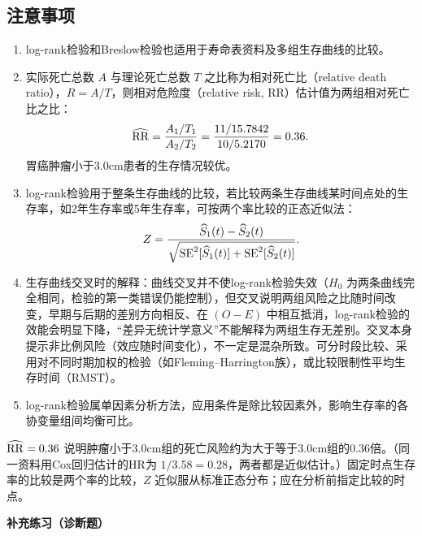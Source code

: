 \subsection{注意事项}
\begin{enumerate}
\item log-rank检验和Breslow检验也适用于寿命表资料及多组生存曲线的比较。
\item 实际死亡总数 $A$ 与理论死亡总数 $T$ 之比称为相对死亡比（relative death ratio），$R=A/T$，则相对危险度（relative risk, RR）估计值为两组相对死亡比之比：
\[
\widehat{\operatorname{RR}}=\frac{A_1/T_1}{A_2/T_2}=\frac{11/15.7842}{10/5.2170}=0.36.
\]
胃癌肿瘤小于3.0cm患者的生存情况较优。
\item log-rank检验用于整条生存曲线的比较，若比较两条生存曲线某时间点处的生存率，如2年生存率或5年生存率，可按两个率比较的正态近似法：
\[
Z=\frac{\widehat S_1(t)-\widehat S_2(t)}{\sqrt{\operatorname{SE}^2[\widehat S_1(t)]+\operatorname{SE}^2[\widehat S_2(t)]}}.
\]
\item 生存曲线交叉时的解释：曲线交叉并不使log-rank检验失效（$H_0$ 为两条曲线完全相同，检验的第一类错误仍能控制），但交叉说明两组风险之比随时间改变，早期与后期的差别方向相反、在 $(O-E)$ 中相互抵消，log-rank检验的效能会明显下降，“差异无统计学意义”不能解释为两组生存无差别。交叉本身提示非比例风险（效应随时间变化），不一定是混杂所致。可分时段比较、采用对不同时期加权的检验（如Fleming--Harrington族），或比较限制性平均生存时间（RMST）。
\item log-rank检验属单因素分析方法，应用条件是除比较因素外，影响生存率的各协变量组间均衡可比。
\end{enumerate}
\begin{annotation}$\widehat{\operatorname{RR}}=0.36$ 说明肿瘤小于3.0cm组的死亡风险约为大于等于3.0cm组的0.36倍。（同一资料用Cox回归估计的HR为 $1/3.58=0.28$，两者都是近似估计。）固定时点生存率的比较是两个率的比较，$Z$ 近似服从标准正态分布；应在分析前指定比较的时点。\end{annotation}
\par{}\noindent\textbf{补充练习（诊断题）}
